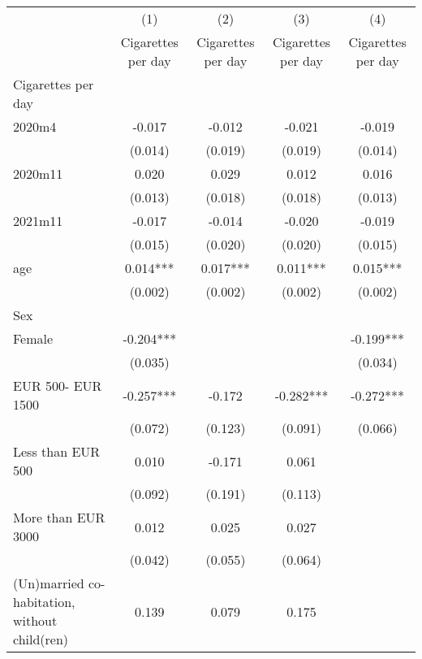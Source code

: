 \begin{table}[htbp]\centering
\def\sym#1{\ifmmode^{#1}\else\(^{#1}\)\fi}
\caption{}
\begin{tabular}{l*{4}{c}}
\toprule
                &\multicolumn{1}{c}{(1)}&\multicolumn{1}{c}{(2)}&\multicolumn{1}{c}{(3)}&\multicolumn{1}{c}{(4)}\\
                &\multicolumn{1}{c}{Cigarettes per day}&\multicolumn{1}{c}{Cigarettes per day}&\multicolumn{1}{c}{Cigarettes per day}&\multicolumn{1}{c}{Cigarettes per day}\\
\midrule
Cigarettes per day&            &            &            &            \\
 2020m4         &   -0.017   &   -0.012   &   -0.021   &   -0.019   \\
                &  (0.014)   &  (0.019)   &  (0.019)   &  (0.014)   \\
2020m11         &    0.020   &    0.029   &    0.012   &    0.016   \\
                &  (0.013)   &  (0.018)   &  (0.018)   &  (0.013)   \\
2021m11         &   -0.017   &   -0.014   &   -0.020   &   -0.019   \\
                &  (0.015)   &  (0.020)   &  (0.020)   &  (0.015)   \\
age             &    0.014***&    0.017***&    0.011***&    0.015***\\
                &  (0.002)   &  (0.002)   &  (0.002)   &  (0.002)   \\
Sex             &            &            &            &            \\
Female          &   -0.204***&            &            &   -0.199***\\
                &  (0.035)   &            &            &  (0.034)   \\
EUR 500- EUR 1500&   -0.257***&   -0.172   &   -0.282***&   -0.272***\\
                &  (0.072)   &  (0.123)   &  (0.091)   &  (0.066)   \\
Less than EUR 500&    0.010   &   -0.171   &    0.061   &            \\
                &  (0.092)   &  (0.191)   &  (0.113)   &            \\
More than EUR 3000&    0.012   &    0.025   &    0.027   &            \\
                &  (0.042)   &  (0.055)   &  (0.064)   &            \\
(Un)married co-habitation, without child(ren)&    0.139   &    0.079   &    0.175   &            \\

\end{tabular}
\end{table}

